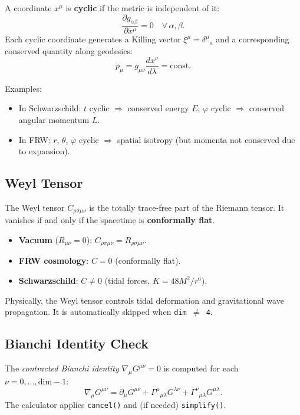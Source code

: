 \documentclass[11pt,a4paper]{article}
\newcommand{\code}[1]{\texttt{\small#1}}
\renewcommand{\Gamma}{\varGamma}
\begin{document}
A coordinate $x^\mu$ is \textbf{cyclic} if the metric is independent of it:
\[
  \frac{\partial g_{\alpha\beta}}{\partial x^\mu} = 0
  \quad \forall\,\alpha,\beta.
\]
Each cyclic coordinate generates a Killing vector $\xi^\mu = \delta^\mu{}_a$
and a corresponding conserved quantity along geodesics:
\[
  p_\mu = g_{\mu\nu}\frac{dx^\nu}{d\lambda} = \text{const}.
\]

Examples:
\begin{itemize}
  \item In Schwarzschild: $t$ cyclic $\Rightarrow$ conserved energy $E$;
        $\varphi$ cyclic $\Rightarrow$ conserved angular momentum $L$.
  \item In FRW: $r$, $\theta$, $\varphi$ cyclic $\Rightarrow$ spatial
        isotropy (but momenta not conserved due to expansion).
\end{itemize}

\subsection{Weyl Tensor}
\label{sec:adv-weyl}

The Weyl tensor $C_{\rho\sigma\mu\nu}$ is the totally trace-free part of the
Riemann tensor.  It vanishes if and only if the spacetime is
\textbf{conformally flat}.

\begin{itemize}
  \item \textbf{Vacuum} ($R_{\mu\nu}=0$): $C_{\rho\sigma\mu\nu} = R_{\rho\sigma\mu\nu}$.
  \item \textbf{FRW cosmology}: $C = 0$ (conformally flat).
  \item \textbf{Schwarzschild}: $C \neq 0$ (tidal forces, $K = 48M^2/r^6$).
\end{itemize}

Physically, the Weyl tensor controls tidal deformation and gravitational
wave propagation.  It is automatically skipped when \code{dim $\neq$ 4}.

\subsection{Bianchi Identity Check}
\label{sec:adv-bianchi}

The \emph{contracted Bianchi identity} $\nabla_\mu G^{\mu\nu} = 0$ is
computed for each $\nu = 0,\ldots,\text{dim}-1$:
\[
  \nabla_\mu G^{\mu\nu}
  = \partial_\mu G^{\mu\nu}
  + \Gamma^\mu{}_{\mu\lambda}G^{\lambda\nu}
  + \Gamma^\nu{}_{\mu\lambda}G^{\mu\lambda}.
\]
The calculator applies \code{cancel()} and (if needed) \code{simplify()}.
\end{document}
